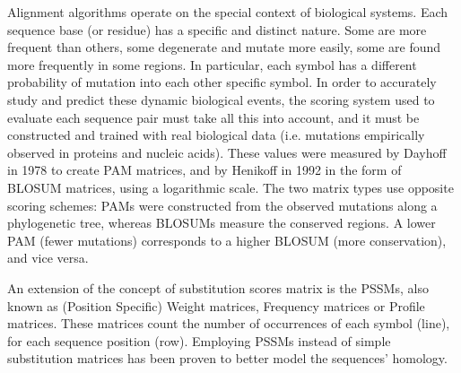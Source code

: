 Alignment algorithms operate on the special context of biological systems. Each sequence base (or residue) has a specific and distinct nature. Some are more frequent than others, some degenerate and mutate more easily, some are found more frequently in some regions. In particular, each symbol has a different probability of mutation into each other specific symbol. In order to accurately study and predict these dynamic biological events, the scoring system used to evaluate each sequence pair must take all this into account, and it must be constructed and trained with real biological data (i.e. mutations empirically observed in proteins and nucleic acids). These values were measured by Dayhoff in 1978 \cite{pam} to create PAM matrices, and by Henikoff in 1992 \cite{blosum} in the form of BLOSUM matrices, using a logarithmic scale. The two matrix types use opposite scoring schemes: PAMs were constructed from the observed mutations along a phylogenetic tree, whereas BLOSUMs measure the conserved regions. A lower PAM (fewer mutations) corresponds to a higher BLOSUM (more conservation), and vice versa.

An extension of the concept of substitution scores matrix is the \acp{PSSM}, also known as (Position Specific) Weight matrices, Frequency matrices or Profile matrices. These matrices count the number of occurrences of each symbol (line), for each sequence position (row). Employing \acp{PSSM} instead of simple substitution matrices has been proven to better model the sequences' homology. \cite{gribskov1987profile} \cite{henikoff1994position} \cite{rudnickipssms}











